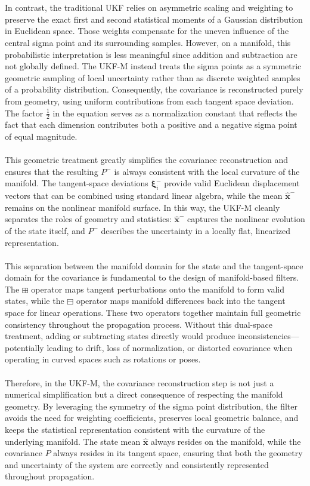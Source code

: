 \\ \\
In contrast, the traditional UKF relies on asymmetric scaling and weighting to preserve the exact first and second statistical moments of a Gaussian distribution in Euclidean space. Those weights compensate for the uneven influence of the central sigma point and its surrounding samples. However, on a manifold, this probabilistic interpretation is less meaningful since addition and subtraction are not globally defined. The UKF-M instead treats the sigma points as a symmetric geometric sampling of local uncertainty rather than as discrete weighted samples of a probability distribution. Consequently, the covariance is reconstructed purely from geometry, using uniform contributions from each tangent space deviation. The factor $\frac{1}{2}$ in the equation serves as a normalization constant that reflects the fact that each dimension contributes both a positive and a negative sigma point of equal magnitude.  
\\ \\
This geometric treatment greatly simplifies the covariance reconstruction and ensures that the resulting $P^-$ is always consistent with the local curvature of the manifold. The tangent-space deviations $\boldsymbol{\xi}_i^-$ provide valid Euclidean displacement vectors that can be combined using standard linear algebra, while the mean $\hat{\mathbf{x}}^-$ remains on the nonlinear manifold surface. In this way, the UKF-M cleanly separates the roles of geometry and statistics: $\hat{\mathbf{x}}^-$ captures the nonlinear evolution of the state itself, and $P^-$ describes the uncertainty in a locally flat, linearized representation.  
\\ \\
This separation between the manifold domain for the state and the tangent-space domain for the covariance is fundamental to the design of manifold-based filters. The $\boxplus$ operator maps tangent perturbations onto the manifold to form valid states, while the $\boxminus$ operator maps manifold differences back into the tangent space for linear operations. These two operators together maintain full geometric consistency throughout the propagation process. Without this dual-space treatment, adding or subtracting states directly would produce inconsistencies—potentially leading to drift, loss of normalization, or distorted covariance when operating in curved spaces such as rotations or poses.  
\\ \\
Therefore, in the UKF-M, the covariance reconstruction step is not just a numerical simplification but a direct consequence of respecting the manifold geometry. By leveraging the symmetry of the sigma point distribution, the filter avoids the need for weighting coefficients, preserves local geometric balance, and keeps the statistical representation consistent with the curvature of the underlying manifold. The state mean $\hat{\mathbf{x}}$ always resides on the manifold, while the covariance $P$ always resides in its tangent space, ensuring that both the geometry and uncertainty of the system are correctly and consistently represented throughout propagation.




